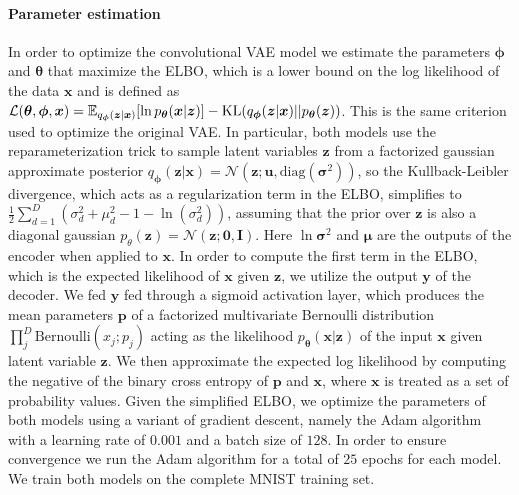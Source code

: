 \paragraph{Parameter estimation}
In order to optimize the convolutional VAE model we estimate the parameters $\bm{\phi}$ and $\bm{\theta}$ that maximize the ELBO, which is a lower bound on the log likelihood of the data $\bm{x}$ and is defined as $\mathcal{L}(\bm{\theta}, \bm{\phi}, \bm{x}) = \E_{q_{\bm{\phi}}(\bm{z}|\bm{x})}{[\ln{p_{\bm{\theta}}(\bm{x} |\bm{z} )}]} - \KL (q_{\bm{\phi}}(\bm{z}|\bm{x}) || p_{\bm{\theta}}(\bm{z}) )$. This is the same criterion used to optimize the original VAE\@. In particular, both models use the reparameterization trick to sample latent variables $\bm{z}$ from a factorized gaussian approximate posterior $q_{\bm{\phi}}(\bm{z}|\bm{x}) = \mathcal{N}(\bm{z}; \bm{u}, \text{diag}(\bm{\sigma}^2))$, so the Kullback-Leibler divergence, which acts as a regularization term in the ELBO, simplifies to $\frac{1}{2}\sum_{d=1}^{D}(\sigma_d^2 + \mu_d^2 - 1 - \ln(\sigma_d^2))$, assuming that the prior over $\bm{z}$ is also a diagonal gaussian $p_{\theta}(\bm{z}) = \mathcal{N}(\bm{z};\bm{0}, \bm{I})$. Here $\ln{\bm{\sigma}^2}$ and $\bm{\mu}$ are the outputs of the encoder when applied to $\bm{x}$. In order to compute the first term in the ELBO, which is the expected likelihood of $\bm{x}$ given $\bm{z}$, we utilize the output $\bm{y}$ of the decoder. We fed $\bm{y}$ fed through a sigmoid activation layer, which produces the mean parameters $\bm{p}$ of a factorized multivariate Bernoulli distribution $\prod_j^{D} \text{Bernoulli}(x_j; p_j)$ acting as the likelihood $p_{\bm{\theta}}(\bm{x} |\bm{z} )$ of the input $\bm{x}$ given latent variable $\bm{z}$. \iffalse As such, one may regard both VAE models as making the simplifying assumption that the MNIST data is binary, which is not technically the case. The simplifying assumption is most likely warranted given that the vast majority of pixels in the MNIST dataset are in fact either $0$ or $1$. Given this simplification , \fi We then approximate  the expected log likelihood by computing the negative of the binary cross entropy of $\bm{p}$ and $\bm{x}$, where $\bm{x}$ is treated as a set of probability values. Given the simplified ELBO, we optimize the parameters of both models using a variant of gradient descent, namely the Adam algorithm with a learning rate of $0.001$ and a batch size of $128$. In order to ensure convergence we run the Adam algorithm for a total of $25$ epochs for each model. We train both models on the complete MNIST training set.